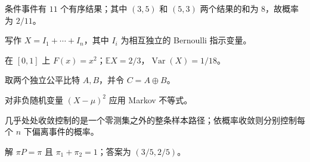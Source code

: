 \begin{selectedhints}
    \item 条件事件有 $11$ 个有序结果；其中 $(3,5)$ 和 $(5,3)$ 两个结果的和为 $8$，故概率为 $2/11$。
    \item 写作 $X=I_1+\cdots+I_n$，其中 $I_i$ 为相互独立的 Bernoulli 指示变量。
    \item 在 $[0,1]$ 上 $F(x)=x^2$；$\mathbb{E}X=2/3$，$\operatorname{Var}(X)=1/18$。
    \item 取两个独立公平比特 $A,B$，并令 $C=A\oplus B$。
    \item 对非负随机变量 $(X-\mu)^2$ 应用 Markov 不等式。
    \item 几乎处处收敛控制的是一个零测集之外的整条样本路径；依概率收敛则分别控制每个 $n$ 下偏离事件的概率。
    \item 解 $\pi P=\pi$ 且 $\pi_1+\pi_2=1$；答案为 $(3/5,2/5)$。
\end{selectedhints}
